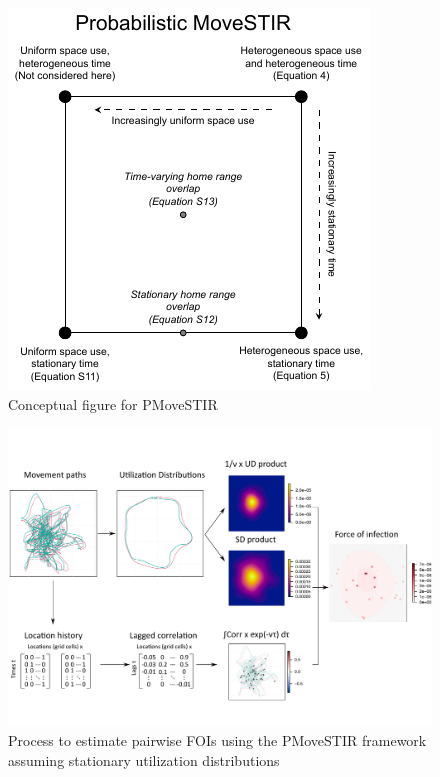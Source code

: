 \documentclass[letterpaper]{article}
\begin{document}
\begin{figure}
    \includegraphics[width=\textwidth]{figures/conceptual_figure_pmovestir.pdf}
    \caption{Conceptual figure for PMoveSTIR}
	\label{fig:square}
\end{figure}

 \begin{figure}
     \includegraphics[width=\textwidth]{figures/steps_diagram.pdf}
     \caption{Process to estimate pairwise FOIs using the PMoveSTIR framework assuming stationary utilization distributions}
 	\label{fig:steps}
 \end{figure}
\end{document}
